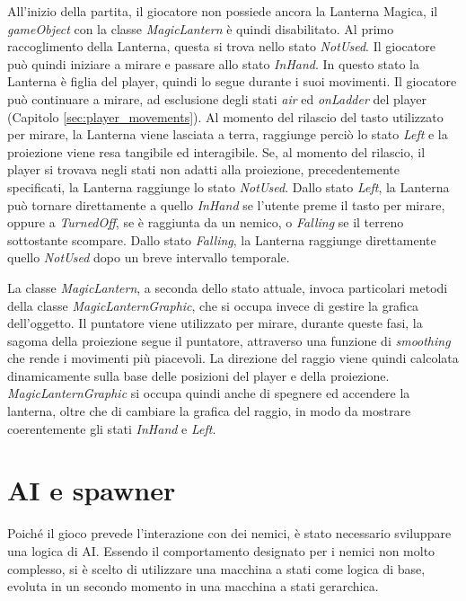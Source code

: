 All’inizio della partita, il giocatore non possiede ancora la Lanterna Magica, il \textit{gameObject} con la classe \textit{MagicLantern} è quindi disabilitato. Al primo raccoglimento della Lanterna, questa si trova nello stato \textit{NotUsed}. Il giocatore può quindi iniziare a mirare e passare allo stato \textit{InHand}. In questo stato la Lanterna è figlia del player, quindi lo segue durante i suoi movimenti.
Il giocatore può continuare a mirare, ad esclusione degli stati \textit{air} ed \textit{onLadder} del player (Capitolo \ref{sec:player_movements}).
Al momento del rilascio del tasto utilizzato per mirare, la Lanterna viene lasciata a terra, raggiunge perciò lo stato \textit{Left} e la proiezione viene resa tangibile ed interagibile. Se, al momento del rilascio, il player si trovava negli stati non adatti alla proiezione, precedentemente specificati, la Lanterna raggiunge lo stato \textit{NotUsed}.
Dallo stato \textit{Left}, la Lanterna può tornare direttamente a quello \textit{InHand} se l’utente preme il tasto per mirare, oppure a \textit{TurnedOff}, se è raggiunta da un nemico, o \textit{Falling} se il terreno sottostante scompare.
Dallo stato \textit{Falling}, la Lanterna raggiunge direttamente quello \textit{NotUsed} dopo un breve intervallo temporale.

La classe \textit{MagicLantern}, a seconda dello stato attuale, invoca particolari metodi della classe \textit{MagicLanternGraphic}, che si occupa invece di gestire la grafica dell’oggetto.
Il puntatore viene utilizzato per mirare, durante queste fasi, la sagoma della proiezione segue il puntatore, attraverso una funzione di \textit{smoothing} che rende i movimenti più piacevoli. La direzione del raggio viene quindi calcolata dinamicamente sulla base delle posizioni del player e della proiezione.
\textit{MagicLanternGraphic} si occupa quindi anche di spegnere ed accendere la lanterna, oltre che di cambiare la grafica del raggio, in modo da mostrare coerentemente gli stati \textit{InHand} e \textit{Left}.


\section{AI e spawner}

Poiché il gioco prevede l'interazione con dei nemici, è stato necessario sviluppare una logica di AI. Essendo il comportamento designato per i nemici non molto complesso, si è scelto di utilizzare una macchina a stati come logica di base, evoluta in un secondo momento in una macchina a stati gerarchica.

